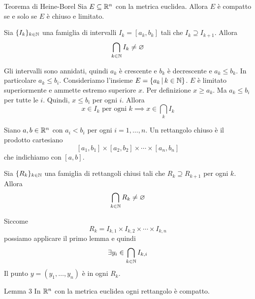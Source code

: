 \documentclass[a4paper]{article}
\begin{document}
\begin{snippettheorem}{Teorema di Heine-Borel}
    Sia \(E \subseteq \mathbb{R}^n\) con la metrica euclidea. Allora \(E\) è compatto se e solo se
    \(E\) è chiuso e limitato.
\end{snippettheorem}

\begin{snippetlemma}{}
    Sia \(\{I_k\}_{k\in \mathbb{N}}\) una famiglia di intervalli
    \(I_k = [a_k, b_k]\) tali che \(I_k \supseteq I_{k+1}\).
    Allora 
    \[
        \bigcap_{k\in \mathbb{N}} I_k \neq \varnothing
    \]
\end{snippetlemma}

\begin{snippetproof}{}
    Gli intervalli sono annidati, quindi \(a_k\) è crescente e \(b_k\) è decrescente e \(a_k \leq b_k\).
    In particolare \(a_k \leq b_i\). Consideriamo l'insieme \(E = \{a_k \,|\, k\in \mathbb{N}\}\).
    \(E\) è limitato superiormente e ammette estremo superiore \(x\).
    Per definizione \(x \geq a_k\). Ma \(a_k \leq b_i\) per tutte le \(i\).
    Quindi, \(x \leq b_i\) per ogni \(i\). Allora
    \[
        x \in I_k \text{ per ogni }k \implies x \in \bigcap_k I_k
    \]
\end{snippetproof}

\begin{snippetdefinition}{}
    Siano \(a,b \in \mathbb{R}^n\) con \(a_i < b_i\) per ogni \(i=1,\ldots,n\).
    Un rettangolo chiuso è il prodotto cartesiano
    \[
        [a_1, b_1] \times [a_2, b_2] \times \cdots \times [a_n, b_n]
    \]
    che indichiamo con \([a,b]\).
\end{snippetdefinition}

\begin{snippetlemma}{}
    Sia \(\{R_k\}_{k\in \mathbb{N}}\) una famiglia di rettangoli chiusi
    tali che \(R_k \supseteq R_{k+1}\) per ogni \(k\).
    Allora
    \[
        \bigcap_{k\in \mathbb{N}} R_k \neq \varnothing
    \]
\end{snippetlemma}

\begin{snippetproof}{}
    Siccome
    \[
        R_k = I_{k,1} \times I_{k,2} \times \cdots \times I_{k,n}
    \]
    possiamo applicare il primo lemma e quindi
    \[
        \exists y_i \in \bigcap_{k\in \mathbb{N}} I_{k,i}
    \]
    Il punto \(y = (y_1, \ldots, y_n)\) è in ogni \(R_k\).
\end{snippetproof}

\begin{snippetlemma}{Lemma 3}
    In \(\mathbb{R}^n\) con la metrica euclidea
    ogni rettangolo è compatto.
\end{snippetlemma}
\end{document}
